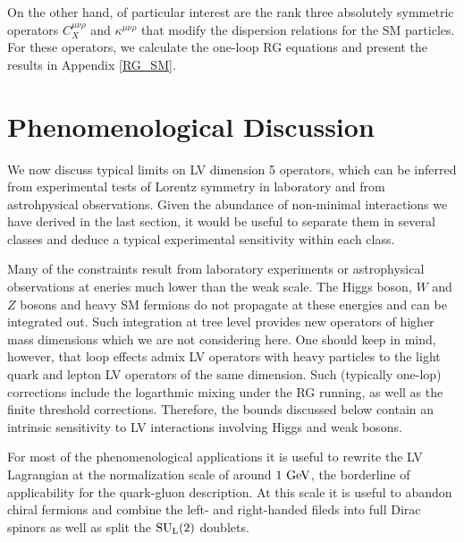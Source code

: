 \documentclass[12pt,preprintnumbers,nofootinbib]{revtex4}
\newcommand{\sul}{{{\rm SU}_{\rm L}(2)}}
\newcommand{\GeV}{{\rm GeV}}
\begin{document}
	On the other hand, of particular interest are
	the rank three absolutely
	symmetric operators $ C_X^{\mu\nu\rho} $ 
	and $ \kappa^{\mu\nu\rho} $ that modify the dispersion relations for the SM particles.
	For these operators, we calculate the one-loop RG equations and present 
the results in Appendix \ref{RG_SM}.


%
%
\section{Phenomenological Discussion}
\label{phenomenology}

	We now discuss typical limits on LV dimension 5 operators, 
	which can be inferred from experimental tests 
	of Lorentz symmetry in laboratory and from astrohpysical observations.
	Given the abundance of non-minimal interactions we have derived in 
	the last section, it would be useful to separate them in several classes 
    and deduce a typical experimental sensitivity within each class.
	
	Many of the constraints result from laboratory experiments
	or astrophysical observations at eneries much lower
	than the weak scale. 
	The Higgs boson, $W$ and $Z$  bosons and heavy SM fermions 
    do not propagate 
	at these energies and can be integrated out.  Such integration at tree level 
    provides new operators of 
	higher mass dimensions which we are not considering here.
	One should keep in mind, however, that loop effects
	admix LV operators with heavy particles to the light quark and lepton 
    LV operators of the same dimension. Such (typically one-lop) corrections 
    include the logarthmic mixing under the RG running,
    as well as the finite threshold corrections. 
	Therefore, the bounds discussed below contain an intrinsic sensitivity to LV 
	interactions involving Higgs and weak bosons. 
	

	For most of the phenomenological applications it 
 is useful to rewrite the LV  Lagrangian at the normalization scale of
	around $ 1~\GeV $, the borderline of applicability for the quark-gluon description.
	At this scale it is useful to abandon chiral fermions and combine the left- and right-handed
fileds into
	full Dirac spinors as well as split the
	$ \sul $ doublets. 
	
\end{document}
